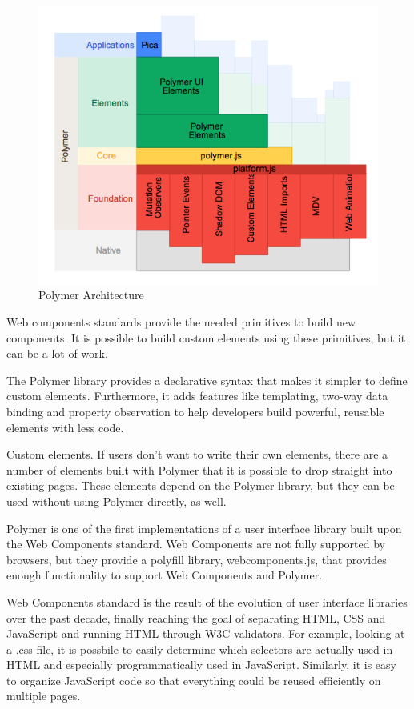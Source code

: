\begin {figure}[h]
\graphicspath{{images/chapter_TCH/}}
\includegraphics[width=\textwidth]{polymer_1}
\caption{Polymer Architecture}
\end {figure}
 

Web components standards provide the needed primitives to build new components. It is possible to build custom elements using these primitives, but it can be a lot of work.

The Polymer library provides a declarative syntax that makes it simpler to define custom elements. Furthermore, it adds features like templating, two-way data binding and property observation to help developers build powerful, reusable elements with less code.

Custom elements. If users don’t want to write their own elements, there are a number of elements built with Polymer that it is possible to drop straight into existing pages. These elements depend on the Polymer library, but they can be used without using Polymer directly, as well.\cite{tch_polymer1}

Polymer is one of the first implementations of a user interface library built upon the Web Components standard.  Web Components are not fully supported by browsers, but they provide a polyfill library, webcomponents.js, that provides enough functionality to support Web Components and Polymer.

Web Components standard is the result of the evolution of user interface libraries over the past decade, finally reaching the goal of separating HTML, CSS and JavaScript and running HTML through W3C validators. For example, looking at a .css file, it is possbile to easily determine which selectors are actually used in HTML and especially programmatically used in JavaScript.  Similarly, it is easy to organize JavaScript code so that everything could be reused efficiently on multiple pages.\cite{tch_polymer2}

